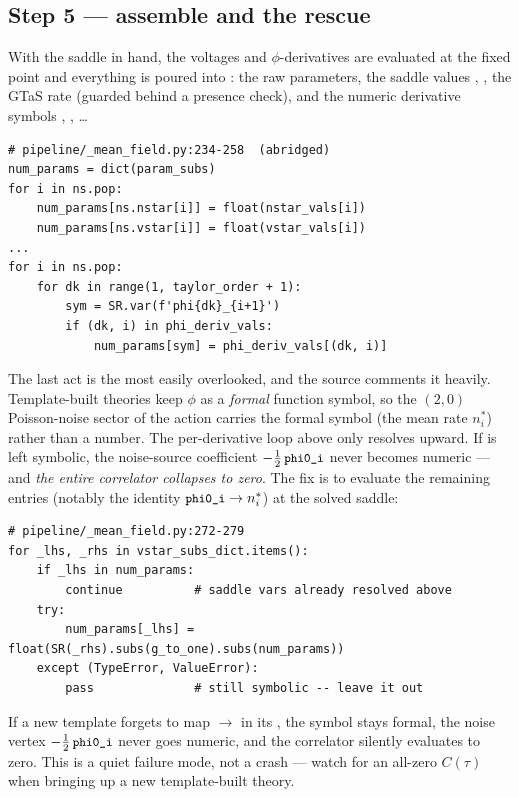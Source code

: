 \subsection{Step 5 --- assemble  and the  rescue}

With the saddle in hand, the voltages and $\phi$-derivatives are evaluated at the
fixed point and everything is poured into : the raw parameters,
the saddle values , , the GTaS rate
 (guarded behind a presence check), and the numeric derivative
symbols , , \dots

\begin{lstlisting}
# pipeline/_mean_field.py:234-258  (abridged)
num_params = dict(param_subs)
for i in ns.pop:
    num_params[ns.nstar[i]] = float(nstar_vals[i])
    num_params[ns.vstar[i]] = float(vstar_vals[i])
...
for i in ns.pop:
    for dk in range(1, taylor_order + 1):
        sym = SR.var(f'phi{dk}_{i+1}')
        if (dk, i) in phi_deriv_vals:
            num_params[sym] = phi_deriv_vals[(dk, i)]
\end{lstlisting}

The last act is the most easily overlooked, and the source comments it heavily.
Template-built theories keep $\phi$ as a \emph{formal} function symbol, so the
$(2,0)$ Poisson-noise sector of the action carries the formal symbol
 (the mean rate $n^{*}_i$) rather than a number. The per-derivative
loop above only resolves  upward. If  is left
symbolic, the noise-source coefficient $-\tfrac12\,\texttt{\small phi0\_i}$ never becomes
numeric --- and \emph{the entire correlator collapses to zero}. The fix is to
evaluate the remaining  entries (notably the identity
$\texttt{\small phi0\_i}\to n^{*}_i$) at the solved saddle:

\begin{lstlisting}
# pipeline/_mean_field.py:272-279
for _lhs, _rhs in vstar_subs_dict.items():
    if _lhs in num_params:
        continue          # saddle vars already resolved above
    try:
        num_params[_lhs] = float(SR(_rhs).subs(g_to_one).subs(num_params))
    except (TypeError, ValueError):
        pass              # still symbolic -- leave it out
\end{lstlisting}

\begin{gotcha}
If a new template forgets to map  $\to$  in its
, the symbol stays formal, the noise vertex
$-\tfrac12\,\texttt{\small phi0\_i}$ never goes numeric, and the correlator silently
evaluates to zero. This is a quiet failure mode, not a crash --- watch for an
all-zero $C(\tau)$ when bringing up a new template-built theory.
\end{gotcha}

